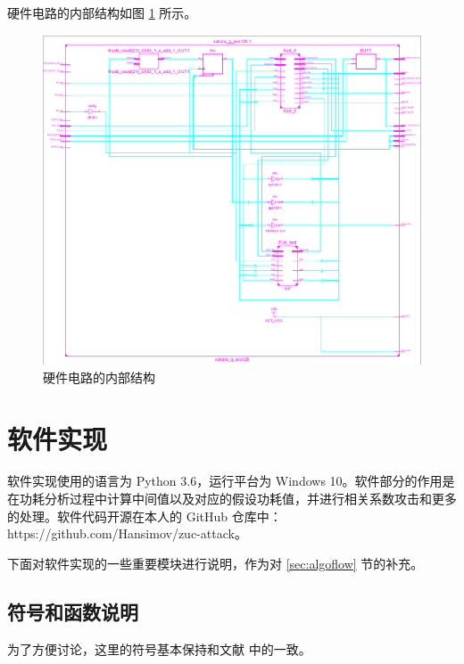 \newpage

硬件电路的内部结构如图 \ref{fig:circuit_more} 所示。

\begin{figure}[htbp]
    \centering
    \includegraphics[height=.6\textheight]{../images/circuit_more.png}
    \caption{硬件电路的内部结构}
    \label{fig:circuit_more}
\end{figure}

\newpage

\section{软件实现}
\label{sec:software}

软件实现使用的语言为 Python 3.6，运行平台为 Windows 10。软件部分的作用是在功耗分析过程中计算中间值以及对应的假设功耗值，并进行相关系数攻击和更多的处理。软件代码开源在本人的 GitHub 仓库中：https://github.com/Hansimov/zuc-attack。

下面对软件实现的一些重要模块进行说明，作为对 \ref{sec:algoflow} 节的补充。

\subsection{符号和函数说明}
为了方便讨论，这里的符号基本保持和文献 \parencite{zuc_standard} 中的一致。

